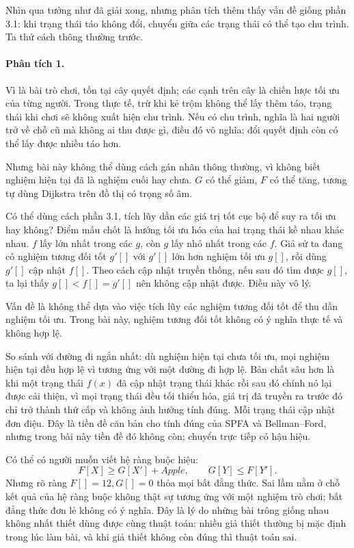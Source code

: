 \documentclass[11pt]{article}
\begin{document}
Nhìn qua tưởng như đã giải xong, nhưng phân tích thêm thấy vấn đề giống phần
3.1: khi trạng thái táo không đổi, chuyển giữa các trạng thái có thể tạo
chu trình. Ta thử cách thông thường trước.

\paragraph{Phân tích 1.}
Vì là bài trò chơi, tồn tại cây quyết định; các cạnh trên cây là chiến lược
tối ưu của từng người. Trong thực tế, trừ khi kẻ trộm không thể lấy thêm táo,
trạng thái khi chơi sẽ không xuất hiện chu trình. Nếu có chu trình, nghĩa là
hai người trở về chỗ cũ mà không ai thu được gì, điều đó vô nghĩa; đổi quyết
định còn có thể lấy được nhiều táo hơn.

Nhưng bài này không thể dùng cách gán nhãn thông thường, vì không biết nghiệm
hiện tại đã là nghiệm cuối hay chưa. \(G\) có thể giảm, \(F\) có thể tăng, tương
tự dùng Dijkstra trên đồ thị có trọng số âm.

Có thể dùng cách phần 3.1, tích lũy dần các giá trị tốt cục bộ để suy ra tối
ưu hay không? Điểm mấu chốt là hướng tối ưu hóa của hai trạng thái kề nhau
khác nhau. \(f\) lấy lớn nhất trong các \(g\), còn \(g\) lấy nhỏ nhất trong
các \(f\). Giả sử ta đang có nghiệm tương đối tốt \(g'[]\) với
\(g'[]\) lớn hơn nghiệm tối ưu \(g[]\), rồi dùng \(g'[]\) cập nhật \(f[]\).
Theo cách cập nhật truyền thống, nếu sau đó tìm được \(g[]\), ta lại thấy
\(g[]<f[]=g'[]\) nên không cập nhật được. Điều này vô lý.

Vấn đề là không thể dựa vào việc tích lũy các nghiệm tương đối tốt để thu dần
nghiệm tối ưu. Trong bài này, nghiệm tương đối tốt không có ý nghĩa thực tế
và không hợp lệ.

So sánh với đường đi ngắn nhất: dù nghiệm hiện tại chưa tối ưu, mọi nghiệm
hiện tại đều hợp lệ vì tương ứng với một đường đi hợp lệ. Bản chất sâu hơn là
khi một trạng thái \(f(x)\) đã cập nhật trạng thái khác rồi sau đó chính nó
lại được cải thiện, vì mọi trạng thái đều tối thiểu hóa, giá trị đã truyền ra
trước đó chỉ trở thành thứ cấp và không ảnh hưởng tính đúng. Mỗi trạng thái
cập nhật đơn điệu. Đây là tiền đề căn bản cho tính đúng của SPFA và
Bellman--Ford, nhưng trong bài này tiền đề đó không còn; chuyển trực tiếp có
hậu hiệu.

Có thể có người muốn viết hệ ràng buộc hiệu:
\[
  F[X]\ge G[X']+\mathit{Apple},\qquad G[Y]\le F[Y'].
\]
Nhưng rõ ràng \(F[]=12, G[]=0\) thỏa mọi bất đẳng thức. Sai lầm nằm ở chỗ kết
quả của hệ ràng buộc không thật sự tương ứng với một nghiệm trò chơi; bất
đẳng thức đơn lẻ không có ý nghĩa. Đây là lý do những bài trông giống nhau
không nhất thiết dùng được cùng thuật toán: nhiều giả thiết thường bị mặc định
trong lúc làm bài, và khi giả thiết không còn đúng thì thuật toán sai.
\end{document}

